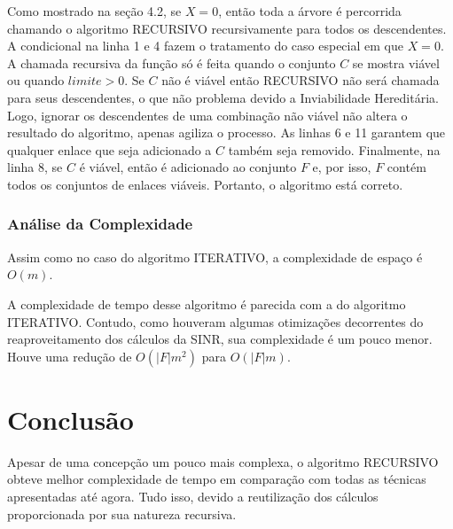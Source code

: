 Como mostrado na seção 4.2, se $X=0$, então toda a árvore é percorrida chamando o algoritmo RECURSIVO recursivamente para todos os descendentes. A condicional na linha 1 e 4 fazem o tratamento do caso especial em que $X=0$. A chamada recursiva da função só é feita quando o conjunto $C$ se mostra viável ou quando $limite>0$. Se $C$ não é viável então RECURSIVO não será chamada para seus descendentes, o que não problema devido a Inviabilidade Hereditária. Logo, ignorar os descendentes de uma combinação não viável não altera o resultado do algoritmo, apenas agiliza o processo. As linhas 6 e 11 garantem que qualquer enlace que seja adicionado a $C$ também seja removido. Finalmente, na linha 8, se $C$ é viável, então é adicionado ao conjunto $F$ e, por isso, $F$ contém todos os conjuntos de enlaces viáveis. Portanto, o algoritmo está correto.

\subsubsection{Análise da Complexidade}

Assim como no caso do algoritmo ITERATIVO, a complexidade de espaço é $O(m)$.

A complexidade de tempo desse algoritmo é parecida com a do algoritmo ITERATIVO. Contudo, como houveram algumas otimizações decorrentes do reaproveitamento dos cálculos da SINR, sua complexidade é um pouco menor. Houve uma redução de $O(|F|m^2)$ para $O(|F|m)$.

\section{Conclusão}

Apesar de uma concepção um pouco mais complexa, o algoritmo RECURSIVO obteve melhor complexidade de tempo em comparação com todas as técnicas apresentadas até agora. Tudo isso, devido a reutilização dos cálculos proporcionada por sua natureza recursiva. 
